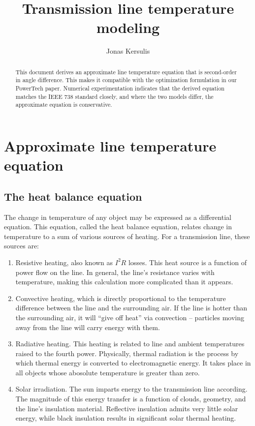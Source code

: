 \documentclass{article}
\author{Jonas Kersulis}
\title{Transmission line temperature modeling}
\begin{document}
    
    \maketitle
    
\begin{abstract}
This document derives an approximate line temperature equation that is second-order in angle difference. This makes it compatible with the optimization formulation in our PowerTech paper. Numerical experimentation indicates that the derived equation matches the IEEE 738 standard closely, and where the two models differ, the approximate equation is conservative.
\end{abstract}
    
\section{Approximate line temperature equation}\label{transmission-line-heating}

\subsection{The heat balance equation}
    The change in temperature of any object may be expressed as a
differential equation. This equation, called the heat balance equation,
relates change in temperature to a sum of various sources of heating.
For a transmission line, these sources are:

\begin{enumerate}
\item
  Resistive heating, also known as $I^2R$ losses. This heat source is a
  function of power flow on the line. In general, the line's resistance
  varies with temperature, making this calculation more complicated than
  it appears.
\item
  Convective heating, which is directly proportional to the temperature
  difference between the line and the surrounding air. If the line is
  hotter than the surrounding air, it will ``give off heat'' via
  convection -- particles moving away from the line will carry energy
  with them.
\item
  Radiative heating. This heating is related to line and ambient
  temperatures raised to the fourth power. Physically, thermal radiation
  is the process by which thermal energy is converted to electromagnetic
  energy. It takes place in all objects whose abosolute temperature is
  greater than zero.
\item
  Solar irradiation. The sun imparts energy to the transmission line
  according. The magnitude of this energy transfer is a function of
  clouds, geometry, and the line's insulation material. Reflective
  insulation admits very little solar energy, while black insulation
  results in significant solar thermal heating.
\end{enumerate}
\end{document}
